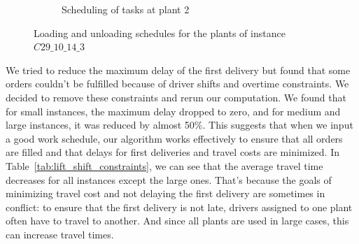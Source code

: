 \documentclass{article}
\begin{document}
\begin{figure}[htb]
\begin{subfigure}{\textwidth}
        \vspace*{-4em}
        \caption{Scheduling of tasks at plant  2}
        \label{fig:plant2}
    \end{subfigure}

    \caption{Loading and unloading schedules for the plants of instance $C29\_10\_14\_3$}
    \label{fig:combined}
\end{figure}
We tried to reduce the maximum delay of the first delivery but found that some orders couldn't be fulfilled because of driver shifts and overtime constraints. We decided to remove these constraints and rerun our computation. We found that for small instances, the maximum delay dropped to zero, and for medium and large instances, it was reduced by almost 50\%. This suggests that when we input a good work schedule, our algorithm works effectively to ensure that all orders are filled and that delays for first deliveries and travel costs are minimized. In Table~\ref*{tab:lift_shift_constraints}, we can see that the average travel time decreases for all instances except the large ones. That's because the goals of minimizing travel cost and not delaying the first delivery are sometimes in conflict: to ensure that the first delivery is not late, drivers assigned to one plant often have to travel to another. And since all plants are used in large cases, this can increase travel times. 


\begin{table}[htbp]
    \centering
    \caption{Comparaison with and without shift and overtime constraints}
    \label{tab:lift_shift_constraints}
    
\end{table}
\end{document}
